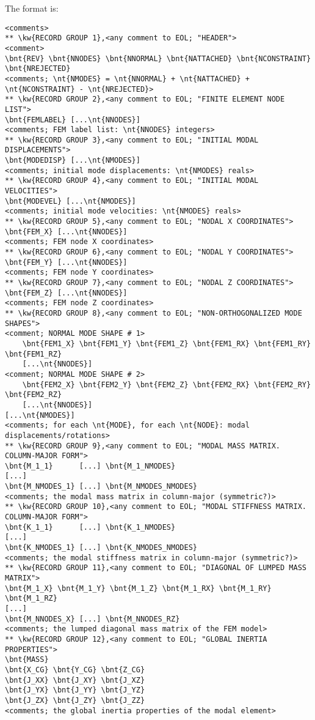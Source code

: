 The format is:
{\small
\begin{Verbatim}[commandchars=\\\{\}]
<comments>
** \kw{RECORD GROUP 1},<any comment to EOL; "HEADER">
<comment>
\bnt{REV} \bnt{NNODES} \bnt{NNORMAL} \bnt{NATTACHED} \bnt{NCONSTRAINT} \bnt{NREJECTED}
<comments; \nt{NMODES} = \nt{NNORMAL} + \nt{NATTACHED} + \nt{NCONSTRAINT} - \nt{NREJECTED}>
** \kw{RECORD GROUP 2},<any comment to EOL; "FINITE ELEMENT NODE LIST">
\bnt{FEMLABEL} [...\nt{NNODES}]
<comments; FEM label list: \nt{NNODES} integers>
** \kw{RECORD GROUP 3},<any comment to EOL; "INITIAL MODAL DISPLACEMENTS">
\bnt{MODEDISP} [...\nt{NMODES}]
<comments; initial mode displacements: \nt{NMODES} reals>
** \kw{RECORD GROUP 4},<any comment to EOL; "INITIAL MODAL VELOCITIES">
\bnt{MODEVEL} [...\nt{NMODES}]
<comments; initial mode velocities: \nt{NMODES} reals>
** \kw{RECORD GROUP 5},<any comment to EOL; "NODAL X COORDINATES">
\bnt{FEM_X} [...\nt{NNODES}]
<comments; FEM node X coordinates>
** \kw{RECORD GROUP 6},<any comment to EOL; "NODAL Y COORDINATES">
\bnt{FEM_Y} [...\nt{NNODES}]
<comments; FEM node Y coordinates>
** \kw{RECORD GROUP 7},<any comment to EOL; "NODAL Z COORDINATES">
\bnt{FEM_Z} [...\nt{NNODES}]
<comments; FEM node Z coordinates>
** \kw{RECORD GROUP 8},<any comment to EOL; "NON-ORTHOGONALIZED MODE SHAPES">
<comment; NORMAL MODE SHAPE # 1>
    \bnt{FEM1_X} \bnt{FEM1_Y} \bnt{FEM1_Z} \bnt{FEM1_RX} \bnt{FEM1_RY} \bnt{FEM1_RZ}
    [...\nt{NNODES}]
<comment; NORMAL MODE SHAPE # 2>
    \bnt{FEM2_X} \bnt{FEM2_Y} \bnt{FEM2_Z} \bnt{FEM2_RX} \bnt{FEM2_RY} \bnt{FEM2_RZ}
    [...\nt{NNODES}]
[...\nt{NMODES}]
<comments; for each \nt{MODE}, for each \nt{NODE}: modal displacements/rotations>
** \kw{RECORD GROUP 9},<any comment to EOL; "MODAL MASS MATRIX. COLUMN-MAJOR FORM">
\bnt{M_1_1}      [...] \bnt{M_1_NMODES}
[...]
\bnt{M_NMODES_1} [...] \bnt{M_NMODES_NMODES}
<comments; the modal mass matrix in column-major (symmetric?)>
** \kw{RECORD GROUP 10},<any comment to EOL; "MODAL STIFFNESS MATRIX. COLUMN-MAJOR FORM">
\bnt{K_1_1}      [...] \bnt{K_1_NMODES}
[...]
\bnt{K_NMODES_1} [...] \bnt{K_NMODES_NMODES}
<comments; the modal stiffness matrix in column-major (symmetric?)>
** \kw{RECORD GROUP 11},<any comment to EOL; "DIAGONAL OF LUMPED MASS MATRIX">
\bnt{M_1_X} \bnt{M_1_Y} \bnt{M_1_Z} \bnt{M_1_RX} \bnt{M_1_RY} \bnt{M_1_RZ}
[...]
\bnt{M_NNODES_X} [...] \bnt{M_NNODES_RZ}
<comments; the lumped diagonal mass matrix of the FEM model>
** \kw{RECORD GROUP 12},<any comment to EOL; "GLOBAL INERTIA PROPERTIES">
\bnt{MASS}
\bnt{X_CG} \bnt{Y_CG} \bnt{Z_CG}
\bnt{J_XX} \bnt{J_XY} \bnt{J_XZ}
\bnt{J_YX} \bnt{J_YY} \bnt{J_YZ}
\bnt{J_ZX} \bnt{J_ZY} \bnt{J_ZZ}
<comments; the global inertia properties of the modal element>
\end{Verbatim}
}

